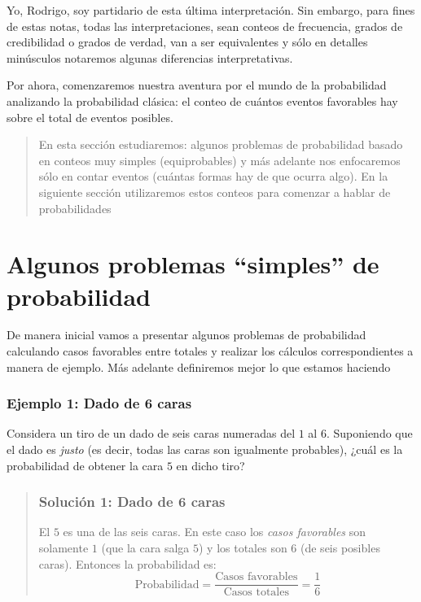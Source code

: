 \documentclass[
]{book}
\newenvironment{Ejemplo}
{\begin{mdframed}[
  linecolor=ejemplocolor,
  skipabove=12pt,
  skipbelow=12pt,
  roundcorner=20pt,
  splittopskip=2\topsep]}
{\end{mdframed}}
\begin{document}
Yo, Rodrigo, soy partidario de esta última interpretación. Sin embargo, para fines de estas notas, todas las interpretaciones, sean conteos de frecuencia, grados de credibilidad o grados de verdad, van a ser equivalentes y sólo en detalles minúsculos notaremos algunas diferencias interpretativas.

Por ahora, comenzaremos nuestra aventura por el mundo de la probabilidad analizando la probabilidad clásica: el conteo de cuántos eventos favorables hay sobre el total de eventos posibles.

\begin{quote}
En esta sección estudiaremos: algunos problemas de probabilidad basado en conteos muy simples (equiprobables) y más adelante nos enfocaremos sólo en contar eventos (cuántas formas hay de que ocurra algo). En la siguiente sección utilizaremos estos conteos para comenzar a hablar de probabilidades
\end{quote}

\hypertarget{algunos-problemas-simples-de-probabilidad}{%
\section{Algunos problemas ``simples'' de probabilidad}\label{algunos-problemas-simples-de-probabilidad}}

De manera inicial vamos a presentar algunos problemas de probabilidad calculando casos favorables entre totales y realizar los cálculos correspondientes a manera de ejemplo. Más adelante definiremos mejor lo que estamos haciendo

\begin{Ejemplo}
\hypertarget{ejemplo-1-dado-de-6-caras}{%
\subsubsection{Ejemplo 1: Dado de 6
caras}\label{ejemplo-1-dado-de-6-caras}}

Considera un tiro de un dado de seis caras numeradas del \(1\) al \(6\).
Suponiendo que el dado es \emph{justo} (es decir, todas las caras son
igualmente probables), ¿cuál es la probabilidad de obtener la cara \(5\)
en dicho tiro?

\begin{quote}
\hypertarget{soluciuxf3n-1-dado-de-6-caras}{%
\subsubsection{Solución 1: Dado de 6
caras}\label{soluciuxf3n-1-dado-de-6-caras}}

El \(5\) es una de las seis caras. En este caso los \emph{casos
favorables} son solamente \(1\) (que la cara salga \(5\)) y los totales
son \(6\) (de seis posibles caras). Entonces la probabilidad es: \[
\textrm{Probabilidad} = \dfrac{\text{Casos favorables}}{\text{Casos totales}} = \dfrac{1}{6}
\]
\end{quote}
\end{Ejemplo}
\end{document}
